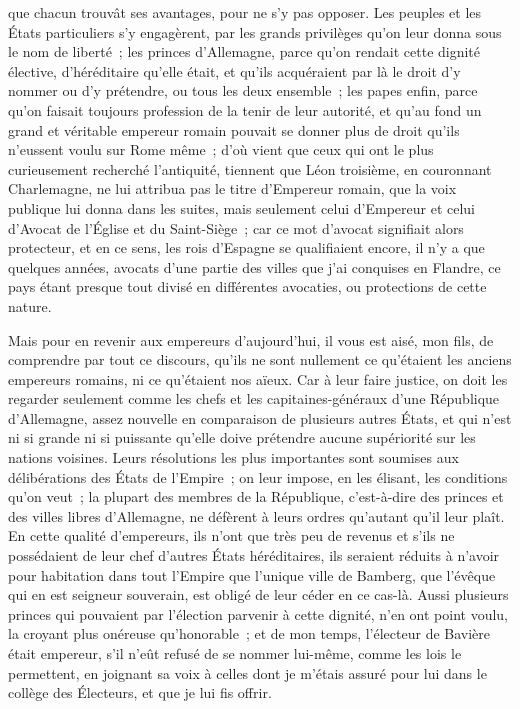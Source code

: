 \documentclass[french,twoside]{book} %
\begin{document}
que chacun trouvât ses avantages, pour ne s’y pas opposer. Les peuples et les États particuliers s’y engagèrent, par les grands privilèges qu’on leur donna sous le nom de liberté ; les princes d’Allemagne, parce qu’on rendait cette dignité élective, d’héréditaire qu’elle était, et qu’ils acquéraient par là le droit d’y nommer ou d’y prétendre, ou tous les deux ensemble ; les papes enfin, parce qu’on faisait toujours profession de la tenir de leur autorité, et qu’au fond un grand et véritable empereur romain pouvait se donner plus de droit qu’ils n’eussent voulu sur Rome même ; d’où vient que ceux qui ont le plus curieusement recherché l’antiquité, tiennent que Léon troisième, en couronnant Charlemagne, ne lui attribua pas le titre d’Empereur romain, que la voix publique lui donna dans les suites, mais seulement celui d’Empereur et celui d’Avocat de l’Église et du Saint-Siège ; car ce mot d’avocat signifiait alors protecteur, et en ce sens, les rois d’Espagne se qualifiaient encore, il n’y a que quelques années, avocats d’une partie des villes que j’ai conquises en Flandre, ce pays étant presque tout divisé en différentes avocaties, ou protections de cette nature.\par
Mais pour en revenir aux empereurs d’aujourd’hui, il vous est aisé, mon fils, de comprendre par tout ce discours, qu’ils ne sont nullement ce qu’étaient les anciens empereurs romains, ni ce qu’étaient nos aïeux. Car à leur faire justice, on doit les regarder seulement comme les chefs et les capitaines-généraux d’une République d’Allemagne, assez nouvelle en comparaison de plusieurs autres États, et qui n’est ni si grande ni si puissante qu’elle doive prétendre aucune supériorité sur les nations voisines. Leurs résolutions les plus importantes sont soumises aux délibérations des États de l’Empire ; on leur impose, en les élisant, les conditions qu’on veut ; la plupart des membres de la République, c’est-à-dire des princes et des villes libres d’Allemagne, ne défèrent à leurs ordres qu’autant qu’il leur plaît. En cette qualité d’empereurs, ils n’ont que très peu de revenus et s’ils ne possédaient de leur chef d’autres États héréditaires, ils seraient réduits à n’avoir pour habitation dans tout l’Empire que l’unique ville de Bamberg, que l’évêque qui en est seigneur souverain, est obligé de leur céder en ce cas-là. Aussi plusieurs princes qui pouvaient par l’élection parvenir à cette dignité, n’en ont point voulu, la croyant plus onéreuse qu’honorable ; et de mon temps, l’électeur de Bavière était empereur, s’il n’eût refusé de se nommer lui-même, comme les lois le permettent, en joignant sa voix à celles dont je m’étais assuré pour lui dans le collège des Électeurs, et que je lui fis offrir.\par
\end{document}

